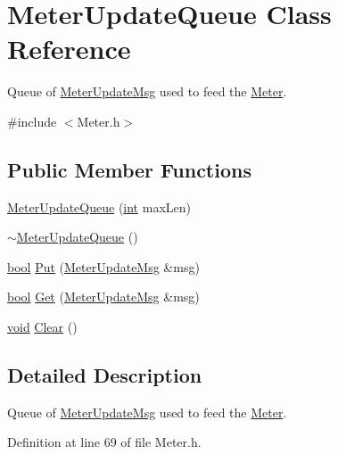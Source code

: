 \hypertarget{class_meter_update_queue}{}\section{Meter\+Update\+Queue Class Reference}
\label{class_meter_update_queue}


Queue of \hyperlink{class_meter_update_msg}{Meter\+Update\+Msg} used to feed the \hyperlink{class_meter}{Meter}.  




{\ttfamily \#include $<$Meter.\+h$>$}

\subsection*{Public Member Functions}
\begin{DoxyCompactItemize}
\item 
\hyperlink{class_meter_update_queue_adea4979d2ca992af5449cb3ceff7df27}{Meter\+Update\+Queue} (\hyperlink{xmltok_8h_a5a0d4a5641ce434f1d23533f2b2e6653}{int} max\+Len)
\item 
\hyperlink{class_meter_update_queue_aa693d95ad71cc693f827dbb28ecb5925}{$\sim$\+Meter\+Update\+Queue} ()
\item 
\hyperlink{mac_2config_2i386_2lib-src_2libsoxr_2soxr-config_8h_abb452686968e48b67397da5f97445f5b}{bool} \hyperlink{class_meter_update_queue_a1f6f9468195fb32d1fd60b8686000543}{Put} (\hyperlink{class_meter_update_msg}{Meter\+Update\+Msg} \&msg)
\item 
\hyperlink{mac_2config_2i386_2lib-src_2libsoxr_2soxr-config_8h_abb452686968e48b67397da5f97445f5b}{bool} \hyperlink{class_meter_update_queue_ad03bd73cff09286c56654a26140bf389}{Get} (\hyperlink{class_meter_update_msg}{Meter\+Update\+Msg} \&msg)
\item 
\hyperlink{sound_8c_ae35f5844602719cf66324f4de2a658b3}{void} \hyperlink{class_meter_update_queue_af23d9f82420916b442c3ed37af2ace05}{Clear} ()
\end{DoxyCompactItemize}


\subsection{Detailed Description}
Queue of \hyperlink{class_meter_update_msg}{Meter\+Update\+Msg} used to feed the \hyperlink{class_meter}{Meter}. 

Definition at line 69 of file Meter.\+h.



